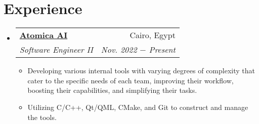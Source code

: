\documentclass[letterpaper, 11pt]{article}
\makeatletter
\newcommand{\experience}[6] {
	\vspace{-1pt}\item[]
  \begin{tabular*}{1\textwidth}[t]{l@{\extracolsep{\fill}}r}
		#1 \href{#2}{\textbf{\color{RoyalBlue}#3}} & #4 \\
    \textit{\small #5} & \textit{\small #6} \\
  \end{tabular*}
  \vspace{-8pt}
}
\newcommand{\subexperience}[1] {
\item\small
  {#1}
  \vspace{-2pt}
}
\makeatother
\begin{document}
\section{Experience}
\begin{itemize}[leftmargin=0pt]
  \experience
	{\faIcon{briefcase}}
  {https://atomica.ai/}{Atomica AI}{Cairo, Egypt}
  {Software Engineer II}{Nov. 2022 $-$ Present}

  \begin{itemize}
    \subexperience
    {Developing various internal tools with varying degrees of complexity that cater to the specific needs of each team, improving their workflow, boosting their capabilities, and simplifying their tasks.}
    \subexperience
    {Utilizing C/C++, Qt/QML, CMake, and Git to construct and manage the tools.}
  \end{itemize}\vspace{-4pt}
\end{itemize}

\end{document}
